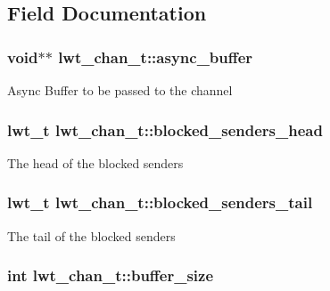 \subsection{Field Documentation}
\hypertarget{structlwt__channel_a52a4a997c097ddda52e23b0bf61216e2}{
\subsubsection[{async\+\_\+buffer}]{\setlength{\rightskip}{0pt plus 5cm}void$\ast$$\ast$ lwt\+\_\+chan\+\_\+t\+::async\+\_\+buffer}}\label{structlwt__channel_a52a4a997c097ddda52e23b0bf61216e2}
Async Buffer to be passed to the channel \hypertarget{structlwt__channel_a34b43c8980f830472deb0cc60a632257}{
\subsubsection[{blocked\+\_\+senders\+\_\+head}]{\setlength{\rightskip}{0pt plus 5cm}lwt\+\_\+t lwt\+\_\+chan\+\_\+t\+::blocked\+\_\+senders\+\_\+head}}\label{structlwt__channel_a34b43c8980f830472deb0cc60a632257}
The head of the blocked senders \hypertarget{structlwt__channel_ad2912304612b27ba7a7b5dd2ec3e2415}{
\subsubsection[{blocked\+\_\+senders\+\_\+tail}]{\setlength{\rightskip}{0pt plus 5cm}lwt\+\_\+t lwt\+\_\+chan\+\_\+t\+::blocked\+\_\+senders\+\_\+tail}}\label{structlwt__channel_ad2912304612b27ba7a7b5dd2ec3e2415}
The tail of the blocked senders \hypertarget{structlwt__channel_a756f9eb27e6321fa7fa5611c2c6bb9eb}{
\subsubsection[{buffer\+\_\+size}]{\setlength{\rightskip}{0pt plus 5cm}int lwt\+\_\+chan\+\_\+t\+::buffer\+\_\+size}}\label{structlwt__channel_a756f9eb27e6321fa7fa5611c2c6bb9eb}
